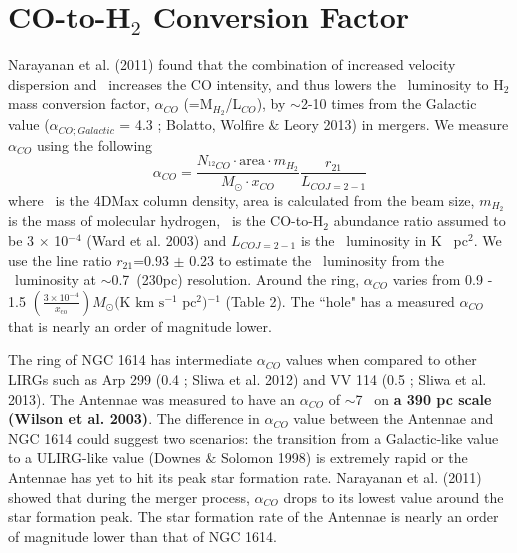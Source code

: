\section{CO-to-H$_{2}$ Conversion Factor}

Narayanan et al. (2011)\nocite{Narayanan2011} found that the combination of increased velocity dispersion and \tkin\ increases the CO intensity, and thus lowers the \co\ luminosity to H$_{2}$ mass conversion factor, $\alpha_{CO}$ (=M$_{H_{2}}$/L$_{CO}$), by $\sim$2-10 times from the Galactic value ($\alpha_{CO;Galactic}$ = 4.3 \alphaco; Bolatto, Wolfire $\&$ Leory 2013)\nocite{Bolatto2013} in mergers. 
We measure $\alpha_{CO}$ using the following
\begin{equation}
\alpha_{CO} = \frac{N_{^{12}CO}\cdot\textrm{area}\cdot m_{H_{2}}}{M_{\odot}\cdot x_{CO}} \frac{r_{21}}{L_{CO J=2-1}}
\end{equation}
where \nco\ is the 4DMax column density, area is calculated from the beam size, $m_{H_{2}}$ is the mass of molecular hydrogen, \xh\ is the CO-to-H$_{2}$ abundance ratio assumed to be 3 $\times$ 10$^{-4}$ (Ward et al. 2003)\nocite{Ward2003} and $L_{CO J=2-1}$ is the \cotwo\ luminosity in K \kms\ pc$^{2}$. We use the line ratio $r_{21}$=0.93 $\pm$ 0.23 to estimate the \coone\ luminosity from the \cotwo\ luminosity at $\sim$0.7\arcsec\ (230pc) resolution. Around the ring, $\alpha_{CO}$ varies from 0.9 - 1.5 $(\frac{3 \times 10^{-4}}{x_{\mathrm{co}}}) \textrm{$M_{\odot}$(K km s$^{-1}$ pc$^{2}$)$^{-1}$}$ (Table 2). The ``hole" has a measured $\alpha_{CO}$ that is nearly an order of magnitude lower.

The ring of NGC 1614 has intermediate $\alpha_{CO}$ values when compared to other LIRGs such as Arp 299 (0.4 \alphaco; Sliwa et al. 2012) and VV 114 (0.5 \alphaco; Sliwa et al. 2013). The Antennae was measured to have an $\alpha_{CO}$ of $\sim$7 \alphaco\ on \textbf{a 390 pc scale (Wilson et al. 2003)\nocite{Wilson2003}}. The difference in $\alpha_{CO}$ value between the Antennae and NGC 1614 could suggest two scenarios: the transition from a Galactic-like value to a ULIRG-like value (Downes $\&$ Solomon 1998)\nocite{Downes1998} is extremely rapid or the Antennae has yet to hit its peak star formation rate. Narayanan et al. (2011) showed that during the merger process, $\alpha_{CO}$ drops to its lowest value around the star formation peak. The star formation rate of the Antennae is nearly an order of magnitude lower than that of NGC 1614. 

